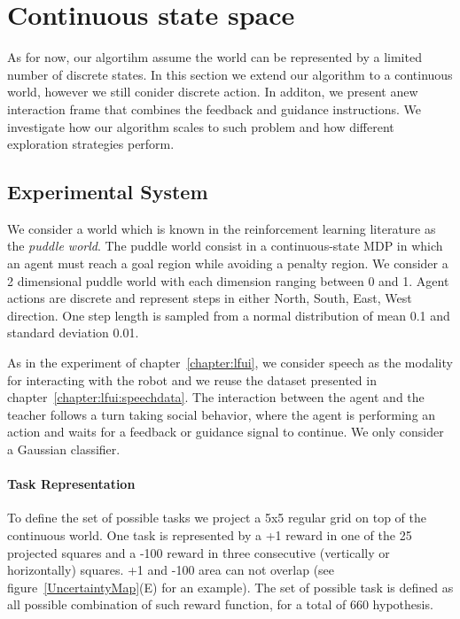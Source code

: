 \section{Continuous state space}
\label{chapter:limitations:continousstate}


As for now, our algortihm assume the world can be represented by a limited number of discrete states. In this section we extend our algorithm to a continuous world, however we still conider discrete action. In additon, we present anew interaction frame that combines the feedback and guidance instructions. We investigate how our algorithm scales to such problem and how different exploration strategies perform.

\subsection{Experimental System}

We consider a world which is known in the reinforcement learning literature as the \emph{puddle world}. The puddle world consist in a continuous-state MDP in which an agent must reach a goal region while avoiding a penalty region. We consider a 2 dimensional puddle world with each dimension ranging between 0 and 1. Agent actions are discrete and represent steps in either North, South, East, West direction. One step length is sampled from a normal distribution of mean 0.1 and standard deviation 0.01.

As in the experiment of chapter~\ref{chapter:lfui}, we consider speech as the modality for interacting with the robot and we reuse the dataset presented in chapter~\ref{chapter:lfui:speechdata}. The interaction between the agent and the teacher follows a turn taking social behavior, where the agent is performing an action and waits for a feedback or guidance signal to continue. We only consider a Gaussian classifier.

\paragraph{Task Representation} 

To define the set of possible tasks we project a 5x5 regular grid on top of the continuous world. One task is represented by a +1 reward in one of the 25 projected squares and a -100 reward in three consecutive (vertically or horizontally) squares. +1 and -100 area can not overlap (see figure~\ref{UncertaintyMap}(E) for an example). The set of possible task is defined as all possible combination of such reward function, for a total of 660 hypothesis. 

